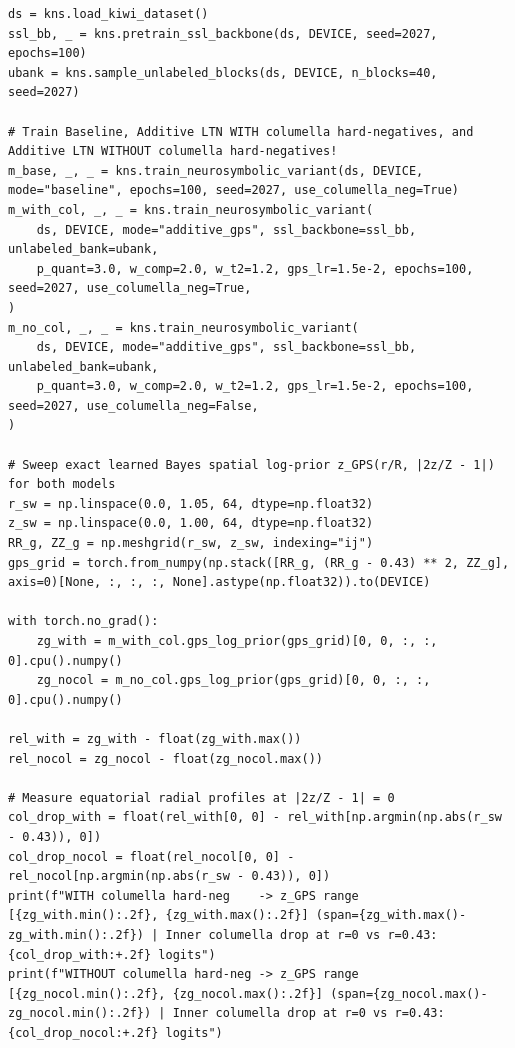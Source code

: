 \documentclass[10pt,a4paper]{article}
\renewcommand{\_}{\origunderscore\allowbreak}
\begin{document}
\begin{codebox}
\begin{lstlisting}[style=pybmed]
ds = kns.load_kiwi_dataset()
ssl_bb, _ = kns.pretrain_ssl_backbone(ds, DEVICE, seed=2027, epochs=100)
ubank = kns.sample_unlabeled_blocks(ds, DEVICE, n_blocks=40, seed=2027)

# Train Baseline, Additive LTN WITH columella hard-negatives, and Additive LTN WITHOUT columella hard-negatives!
m_base, _, _ = kns.train_neurosymbolic_variant(ds, DEVICE, mode="baseline", epochs=100, seed=2027, use_columella_neg=True)
m_with_col, _, _ = kns.train_neurosymbolic_variant(
    ds, DEVICE, mode="additive_gps", ssl_backbone=ssl_bb, unlabeled_bank=ubank,
    p_quant=3.0, w_comp=2.0, w_t2=1.2, gps_lr=1.5e-2, epochs=100, seed=2027, use_columella_neg=True,
)
m_no_col, _, _ = kns.train_neurosymbolic_variant(
    ds, DEVICE, mode="additive_gps", ssl_backbone=ssl_bb, unlabeled_bank=ubank,
    p_quant=3.0, w_comp=2.0, w_t2=1.2, gps_lr=1.5e-2, epochs=100, seed=2027, use_columella_neg=False,
)

# Sweep exact learned Bayes spatial log-prior z_GPS(r/R, |2z/Z - 1|) for both models
r_sw = np.linspace(0.0, 1.05, 64, dtype=np.float32)
z_sw = np.linspace(0.0, 1.00, 64, dtype=np.float32)
RR_g, ZZ_g = np.meshgrid(r_sw, z_sw, indexing="ij")
gps_grid = torch.from_numpy(np.stack([RR_g, (RR_g - 0.43) ** 2, ZZ_g], axis=0)[None, :, :, :, None].astype(np.float32)).to(DEVICE)

with torch.no_grad():
    zg_with = m_with_col.gps_log_prior(gps_grid)[0, 0, :, :, 0].cpu().numpy()
    zg_nocol = m_no_col.gps_log_prior(gps_grid)[0, 0, :, :, 0].cpu().numpy()

rel_with = zg_with - float(zg_with.max())
rel_nocol = zg_nocol - float(zg_nocol.max())

# Measure equatorial radial profiles at |2z/Z - 1| = 0
col_drop_with = float(rel_with[0, 0] - rel_with[np.argmin(np.abs(r_sw - 0.43)), 0])
col_drop_nocol = float(rel_nocol[0, 0] - rel_nocol[np.argmin(np.abs(r_sw - 0.43)), 0])
print(f"WITH columella hard-neg    -> z_GPS range [{zg_with.min():.2f}, {zg_with.max():.2f}] (span={zg_with.max()-zg_with.min():.2f}) | Inner columella drop at r=0 vs r=0.43: {col_drop_with:+.2f} logits")
print(f"WITHOUT columella hard-neg -> z_GPS range [{zg_nocol.min():.2f}, {zg_nocol.max():.2f}] (span={zg_nocol.max()-zg_nocol.min():.2f}) | Inner columella drop at r=0 vs r=0.43: {col_drop_nocol:+.2f} logits")


\end{lstlisting}
\end{codebox}
\end{document}

